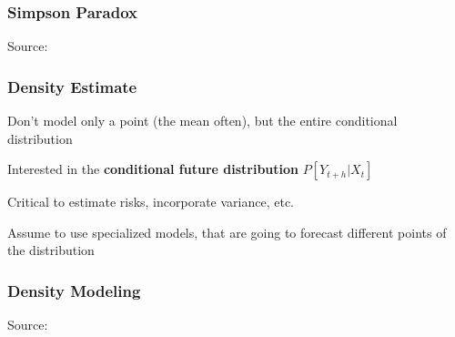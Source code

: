 \documentclass{beamer}
\newenvironment{wideitemize}{\itemize\addtolength{\itemsep}{10pt}}{\enditemize}
\begin{document}
\begin{frame}
  \frametitle{Simpson Paradox}
  \hspace*{15pt}\hbox{\scriptsize Source:}
\end{frame}

  

  \begin{frame}
    \frametitle{Density Estimate}
    \begin{wideitemize}
    \item Don't model only a point (the mean often), but the entire conditional distribution
    \item Interested in the \textbf{conditional future distribution} $P[Y_{t+h} | X_t]$
    \item Critical to estimate risks, incorporate variance, etc.
    \item Assume to use specialized models, that are going to forecast different points of the distribution
    \end{wideitemize}
  \end{frame}


\begin{frame}
  \frametitle{Density Modeling}
  \hspace*{15pt}\hbox{\scriptsize Source:}
\end{frame}
\end{document}
